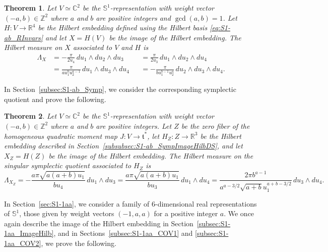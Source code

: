 \documentclass[twoside]{amsart}
\newtheorem{mainthm}{Theorem}
\theoremstyle{definition}
\theoremstyle{remark}
\numberwithin{equation}{section}
\newcommand{\C}{\mathbb{C}}
\newcommand{\Sp}{\mathbb{S}}
\newcommand{\R}{\mathbb{R}}
\newcommand{\Z}{\mathbb{Z}}
\begin{document}
\begin{mainthm}
\label{mainthm:S1-ab}
Let $V\simeq\C^2$ be the $\Sp^1$-representation with weight vector $(-a,b)\in\Z^2$ where $a$ and $b$ are positive integers and $\gcd(a,b) = 1$.
Let $H\colon V\to\R^4$ be the Hilbert embedding defined using the Hilbert basis \eqref{eq:S1-ab_RInvars} and let $X = H(V)$ be the image
of the Hilbert embedding. The Hilbert measure on $X$ associated to $V$ and $H$ is
\begin{equation}
\label{eq:Main_S1-ab}
\begin{aligned}
    \Lambda_X
    &=
    - \frac{\pi }
        {2 u_4} \, du_1\wedge du_2 \wedge du_3
    &&=
    \frac{\pi}
        {2 u_3} \, du_1\wedge du_2 \wedge du_4
    \\&=
    \frac{\pi }
        {a u_1^b u_2^{a-1}} \, du_1\wedge du_3 \wedge du_4
    &&=
    - \frac{\pi}
        {b u_1^{b - 1} u_2^a} \, du_2\wedge du_3 \wedge du_4.
\end{aligned}
\end{equation}
\end{mainthm}

In Section~\ref{subsec:S1-ab_Symp}, we consider the corresponding symplectic quotient and prove the following.

\begin{mainthm}
\label{mainthm:S1-ab_Symp}
Let $V\simeq\C^2$ be the $\Sp^1$-representation with weight vector $(-a,b)\in\Z^2$ where $a$ and $b$ are positive integers.
Let $Z$ be the zero fiber of the homogeneous quadratic moment map $J\colon V\to\mathfrak{t}^\ast$,
let $H_Z\colon Z\to\R^3$ be the Hilbert embedding described in Section~\ref{subsubsec:S1-ab_SympImageHilbDS}, and let $X_Z = H(Z)$ be the image
of the Hilbert embedding. The Hilbert measure on the singular symplectic quotient associated to $H_Z$ is
\begin{equation}
\label{eq:Main_S1-ab_Symp}
    \Lambda_{X_Z}
    =
    - \frac{ a \pi \sqrt{a(a + b) u_1 }  }
        { b u_4 }
        \, du_1\wedge du_3
    =
    \frac{ a \pi \sqrt{a(a + b)u_1}  }
        { b u_3}
        \, du_1\wedge du_4
    =
    \frac{ 2\pi b^{a-1}}
        { a^{a-3/2} \sqrt{a + b} u_1^{a + b - 3/2} }
        \, du_3\wedge du_4.
\end{equation}
\end{mainthm}

In Section~\ref{sec:S1-1aa}, we consider a family of $6$-dimensional real representations of $\Sp^1$, those given by weight vectors $(-1,a,a)$
for a positive integer $a$. We once again describe the image of the Hilbert embedding in Section~\ref{subsec:S1-1aa_ImageHilb},
and in Sections~\ref{subsec:S1-1aa_COV1} and \ref{subsec:S1-1aa_COV2}, we prove the following.
\end{document}
